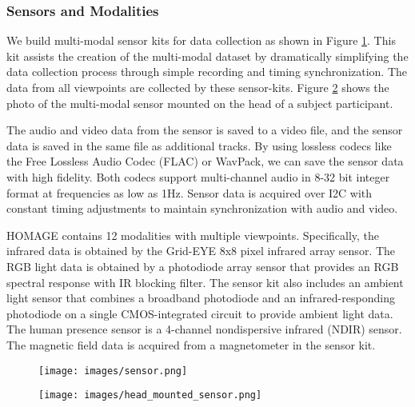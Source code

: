 \documentclass[final]{cvpr}
\begin{document}
\subsubsection*{Sensors and Modalities}

We build multi-modal sensor kits for data collection as shown in Figure \ref{fig:sensor}. This kit assists the creation of the multi-modal dataset by dramatically simplifying the data collection process through simple recording and timing synchronization.  The data from all viewpoints are collected by these sensor-kits. Figure \ref{fig:sensor_photo} shows the photo of the multi-modal sensor mounted on the head of a subject participant.

The audio and video data from the sensor is saved to a video file, and the sensor data is saved in the same file as additional tracks. By using lossless codecs like the Free Lossless Audio Codec (FLAC) or WavPack, we can save the sensor data with high fidelity. Both codecs support multi-channel audio in 8-32 bit integer format at frequencies as low as 1Hz. Sensor data is acquired over I2C with constant timing adjustments to maintain synchronization with audio and video.

HOMAGE contains 12 modalities with multiple viewpoints. Specifically, the infrared data is obtained by the Grid-EYE 8x8 pixel infrared array sensor. The RGB light data is obtained by a photodiode array sensor that provides an RGB spectral response with IR blocking filter. The sensor kit also includes an ambient light sensor that combines a broadband photodiode and an infrared-responding photodiode on a single CMOS-integrated circuit to provide ambient light data. The human presence sensor is a 4-channel nondispersive infrared (NDIR) sensor. The magnetic field data is acquired from a magnetometer in the sensor kit.

\begin{figure}[b]
\begin{center}
    \centering
    \texttt{[image: images/sensor.png]}
    \label{fig:sensor}
    \centering
\end{center}
\end{figure}

\begin{figure}[t]
\begin{center}
    \centering
    \texttt{[image: images/head\_mounted\_sensor.png]}\vspace{-10pt}
    \label{fig:sensor_photo}
    \centering
\end{center}
\end{figure}
\end{document}
